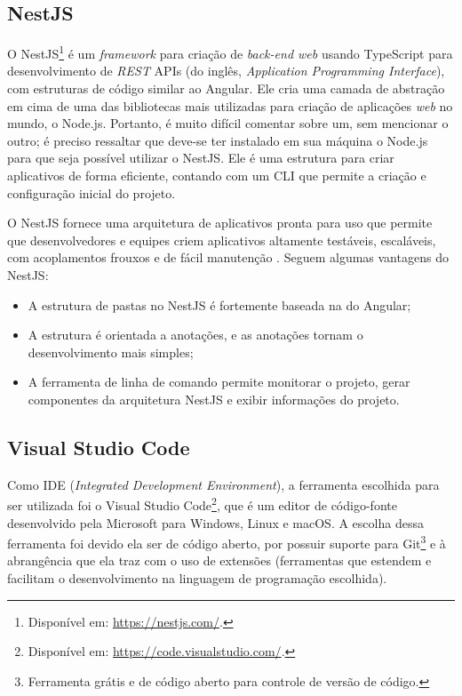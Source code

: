 \subsection{NestJS}
\label{ssec:NestJS}
O NestJS\footnote{Disponível em: \url{https://nestjs.com/}.} é um \textit{framework} para criação de \textit{back-end web} usando TypeScript para desenvolvimento de \textit{REST} APIs (do inglês, \textit{Application Programming Interface}), com estruturas de código similar ao Angular. Ele cria uma camada de abstração em cima de uma das bibliotecas mais utilizadas para criação de aplicações \textit{web} no mundo, o Node.js. Portanto, é muito difícil comentar sobre um, sem mencionar o outro; é preciso ressaltar que deve-se ter instalado em sua máquina o Node.js para que seja possível utilizar o NestJS. Ele é uma estrutura para criar aplicativos de forma eficiente, contando com um CLI que permite a criação e configuração inicial do projeto.

O NestJS fornece uma arquitetura de aplicativos pronta para uso que permite que desenvolvedores e equipes criem aplicativos altamente testáveis, escaláveis, com acoplamentos frouxos e de fácil manutenção \cite{kamil2020nestjs}. Seguem algumas vantagens do NestJS:

\begin{itemize}
    \item A estrutura de pastas no NestJS é fortemente baseada na do Angular;
    \item A estrutura é orientada a anotações, e as anotações tornam o desenvolvimento mais simples;
    \item A ferramenta de linha de comando permite monitorar o projeto, gerar componentes da arquitetura NestJS e exibir informações do projeto.
\end{itemize}

\subsection{Visual Studio Code}
\label{ssec:VSCode}
Como IDE (\textit{Integrated Development Environment}), a ferramenta escolhida para ser utilizada foi o Visual Studio Code\footnote{Disponível em: \url{https://code.visualstudio.com/}.}, que é um editor de código-fonte desenvolvido pela Microsoft para Windows, Linux e macOS. A escolha dessa ferramenta foi devido ela ser de código aberto, por possuir suporte para Git\footnote{Ferramenta grátis e de código aberto para controle de versão de código.} e à abrangência que ela traz com o uso de extensões (ferramentas que estendem e facilitam o desenvolvimento na linguagem de programação escolhida).

